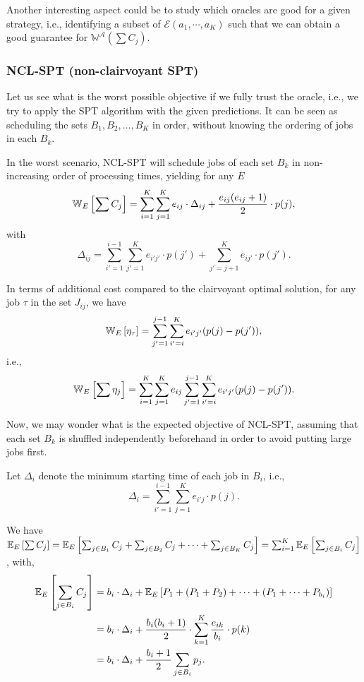 \documentclass{article}
\begin{document}
Another interesting aspect could be to study which oracles are good for a given strategy, i.e., identifying a subset of \(\mathcal{E}(a_1,\cdots,a_K)\) such that we can obtain a good guarantee for \(\mathbb{W}^{\mathcal{A}}\left(\sum C_j\right)\).


\subsubsection{NCL-SPT (non-clairvoyant SPT)}

Let us see what is the worst possible objective if we fully trust the oracle, i.e., we try to apply the SPT algorithm with the given predictions.
It can be seen as scheduling the sets \(B_1,B_2,\dots,B_K\) in order, without knowing the ordering of jobs in each \(B_k\).

In the worst scenario, NCL-SPT will schedule jobs of each set \(B_k\) in non-increasing order of processing times, yielding for any \(E\)
\[
    \mathbb{W}_E\left[\sum C_j\right]=\sum_{i=1}^{K} \sum_{j=1}^{K} e_{ij} \cdot \Delta_{ij} + \frac{e_{ij}(e_{ij}+1)}{2} \cdot p(j),
\]
with
\[
    \Delta_{ij}=\sum_{i'=1}^{i-1} \sum_{j'=1}^{K} e_{i'j'} \cdot p(j') + \sum_{j'=j+1}^{K} e_{ij'} \cdot p(j').
\]

In terms of additional cost compared to the clairvoyant optimal solution, for any job \(\tau\) in the set \(J_{ij}\), we have
\[
    \mathbb{W}_E\left[\eta_{\tau}\right]=\sum_{j'=1}^{j-1}\sum_{i'=i}^K e_{i'j'}(p(j)-p(j')),
\]
i.e.,
\[
    \mathbb{W}_E\left[\sum\eta_j\right]=\sum_{i=1}^K \sum_{j=1}^K e_{ij} \sum_{j'=1}^{j-1}\sum_{i'=i}^K e_{i'j'}(p(j)-p(j')).
\]

Now, we may wonder what is the expected objective of NCL-SPT, assuming that each set \(B_k\) is shuffled independently beforehand in order to avoid putting large jobs first.

Let \(\Delta_i\) denote the minimum starting time of each job in \(B_i\), i.e.,
\[
    \Delta_i=\sum_{i'=1}^{i-1} \sum_{j=1}^{K} e_{i'j} \cdot p(j).
\]

We have \(\mathbb{E}_E\left[\sum C_j\right]=\mathbb{E}_E\left[\sum_{j\in B_1} C_j + \sum_{j\in B_2} C_j + \dots + \sum_{j\in B_K} C_j\right]=\sum_{i=1}^{K} \mathbb{E}_E\left[\sum_{j\in B_i} C_j\right]\), with,
\begin{align*}
    \mathbb{E}_E\left[\sum_{j\in B_i} C_j\right]
    &=b_i \cdot \Delta_i + \mathbb{E}_E\left[P_1+(P_1+P_2)+\dots+(P_1+\dots+P_{b_i})\right] \\
    &=b_i \cdot \Delta_i + \frac{b_i(b_i+1)}{2} \cdot \sum_{k=1}^{K} \frac{e_{ik}}{b_i} \cdot p(k) \\
    &=b_i \cdot \Delta_i + \frac{b_i+1}{2} \sum_{j\in B_i} p_j.
\end{align*}
\end{document}
